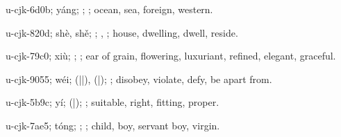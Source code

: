\begin{multicols}{2}
{\cjkgGlue{}u-cjk-6d0b; yáng; \cjkgGlue{}; \cjkgGlue{}; ocean, sea, foreign, western.

\cjkgGlue{}u-cjk-820d; shè, shě; \cjkgGlue{}\cjkgGlue{}\cjkgGlue{}; \cjkgGlue{}, \cjkgGlue{}; house, dwelling, dwell, reside.

\cjkgGlue{}u-cjk-79c0; xiù; \cjkgGlue{}\cjkgGlue{}\cjkgGlue{}; \cjkgGlue{}; ear of grain, flowering, luxuriant, refined, elegant, graceful.

\cjkgGlue{}u-cjk-9055; wéi; \cjkgGlue{}\cjkgGlue{}(\cjkgGlue{}|\cjkgGlue{}|\cjkgGlue{}), \cjkgGlue{}\cjkgGlue{}(\cjkgGlue{}|\cjkgGlue{}); \cjkgGlue{}; disobey, violate, defy, be apart from.

\cjkgGlue{}u-cjk-5b9c; yí; \cjkgGlue{}\cjkgGlue{}(\cjkgGlue{}|\cjkgGlue{}); \cjkgGlue{}; suitable, right, fitting, proper.

\cjkgGlue{}u-cjk-7ae5; tóng; \cjkgGlue{}; \cjkgGlue{}; child, boy, servant boy, virgin.

}
\end{multicols}
